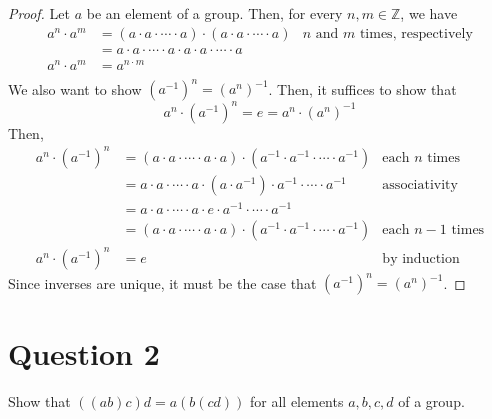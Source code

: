 \documentclass[13pt]{article}
\begin{document}
\begin{proof}
  Let $a$ be an element of a group. Then, for every $n, m \in \mathbb{Z}$, we have
  \begin{align*}
    a^n \cdot a^m &= (a \cdot a \cdot \cdots \cdot a) \cdot (a \cdot a \cdot \cdots \cdot a) & n \text{ and } m \text{ times,
                                                                   respectively} \\
                  &= a \cdot a \cdot \cdots \cdot a \cdot a \cdot a \cdot \cdots \cdot a \\
    a^n \cdot a^m &= a^{n \cdot m} \\
  \end{align*}
  We also want to show $\left(a^{-1}\right)^n = \left(a^n\right)^{-1}$. Then, it suffices to show
  that
  \[a^n \cdot \left(a^{-1}\right)^n = e = a^n \cdot \left(a^n\right)^{-1}\]
  Then,
  \begin{align*}
    a^n \cdot \left(a^{-1}\right)^n &= (a \cdot a \cdot \cdots \cdot a \cdot a) \cdot
                                      (a^{-1} \cdot a^{-1} \cdot \cdots \cdot a^{-1}) & \text{each }
                                                                                        n \text{ times} \\
                                    &= a \cdot a \cdot \cdots \cdot a \cdot (a \cdot
                                      a^{-1}) \cdot a^{-1} \cdot \cdots \cdot a^{-1} &
                                                                                       \text{associativity}\\
                                    &= a \cdot a \cdot \cdots \cdot a \cdot e
                                      \cdot a^{-1} \cdot \cdots \cdot a^{-1} \\
                                    &= (a \cdot a \cdot \cdots \cdot a \cdot a) \cdot
                                      (a^{-1} \cdot a^{-1} \cdot \cdots \cdot a^{-1}) & \text{each }
                                                                                        n - 1 \text{ times} \\
    a^n \cdot \left(a^{-1}\right)^n &= e & \text{by induction}
  \end{align*}
  Since inverses are unique, it must be the case that $\left(a^{-1}\right)^n = \left(a^n\right)^{-1}$.
\end{proof}





\newpage
\section*{Question 2}
Show that $((ab)c)d = a(b(cd))$ for all elements $a, b, c, d$ of a group.
\end{document}
